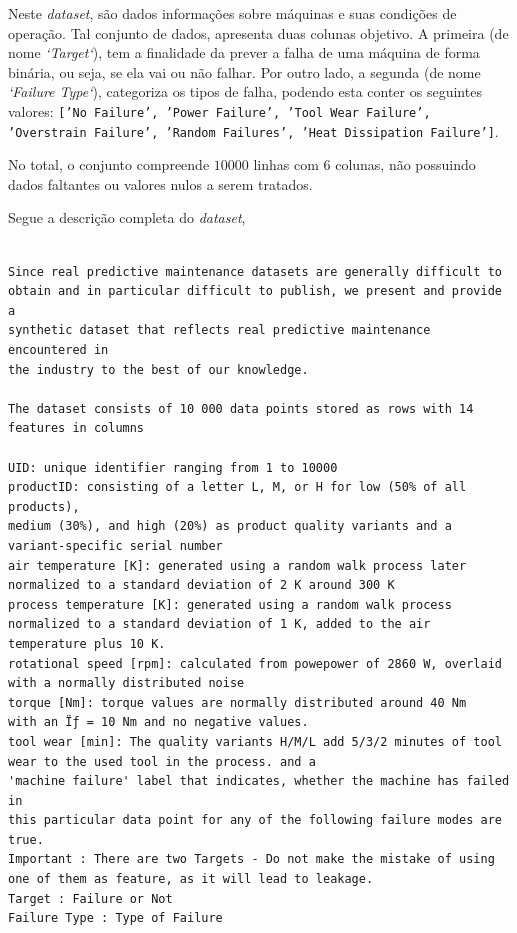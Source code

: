 \documentclass{paper}
\begin{document}
Neste  \textit{dataset}, são dados informações sobre máquinas e suas condições de operação. Tal conjunto de dados, apresenta duas colunas objetivo. A primeira (de nome \textit{`Target`}), tem a finalidade da prever a falha de uma máquina de forma binária, ou seja, se ela vai ou não falhar. Por outro lado, a segunda (de nome \textit{`Failure Type`}), categoriza os tipos de falha, podendo esta conter os seguintes valores: \texttt{['No Failure', 'Power Failure', 'Tool Wear Failure', 'Overstrain Failure', 'Random Failures', 'Heat Dissipation Failure']}.

No total, o conjunto compreende $10000$ linhas com $6$ colunas, não possuindo dados faltantes ou valores nulos a serem tratados.

Segue a descrição completa do \textit{dataset},

\begin{verbatim}

Since real predictive maintenance datasets are generally difficult to 
obtain and in particular difficult to publish, we present and provide a 
synthetic dataset that reflects real predictive maintenance encountered in 
the industry to the best of our knowledge.

The dataset consists of 10 000 data points stored as rows with 14 features in columns

UID: unique identifier ranging from 1 to 10000
productID: consisting of a letter L, M, or H for low (50% of all products), 
medium (30%), and high (20%) as product quality variants and a 
variant-specific serial number
air temperature [K]: generated using a random walk process later 
normalized to a standard deviation of 2 K around 300 K
process temperature [K]: generated using a random walk process 
normalized to a standard deviation of 1 K, added to the air temperature plus 10 K.
rotational speed [rpm]: calculated from powepower of 2860 W, overlaid 
with a normally distributed noise
torque [Nm]: torque values are normally distributed around 40 Nm 
with an Ïƒ = 10 Nm and no negative values.
tool wear [min]: The quality variants H/M/L add 5/3/2 minutes of tool
wear to the used tool in the process. and a
'machine failure' label that indicates, whether the machine has failed in 
this particular data point for any of the following failure modes are true.
Important : There are two Targets - Do not make the mistake of using 
one of them as feature, as it will lead to leakage.
Target : Failure or Not
Failure Type : Type of Failure

\end{verbatim}
\end{document}
